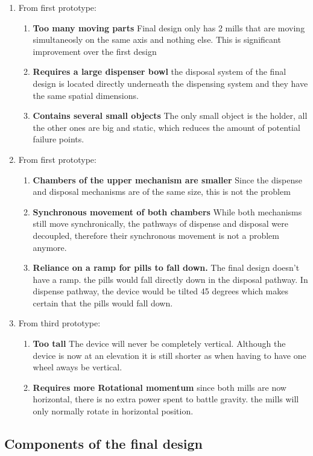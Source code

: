 \begin{enumerate}
	\item{From first prototype:}
	\begin{enumerate}
		\item{\textbf{Too many moving parts}} Final design only has 2 mills that are moving simultaneosly on the same axis and nothing else. This is significant improvement over the first design
		\item{\textbf{Requires a large dispenser bowl}} the disposal system of the final design is located directly underneath the dispensing system and they have the same spatial dimensions.
		\item{\textbf{Contains several small objects}} The only small object is the holder, all the other ones are big and static, which reduces the amount of potential failure points.
	\end{enumerate}
	\item{From first prototype:}
	\begin{enumerate}
		\item{\textbf{Chambers of the upper mechanism are smaller}} Since the dispense and disposal mechanisms are of the same size, this is not the problem
		\item{\textbf{Synchronous movement of both chambers}} While both mechanisms still move synchronically, the pathways of dispense and disposal were decoupled, therefore their synchronous movement is not a problem anymore.
		\item{\textbf{Reliance on a ramp for pills to fall down.}} The final design doesn't have a ramp. the pills would fall directly down in the disposal pathway. In dispense pathway, the device would be tilted 45 degrees which makes certain that the pills would fall down.
	\end{enumerate}
	\item{From third prototype:}
	\begin{enumerate}
		\item{\textbf{Too tall}} The device will never be completely vertical. Although the device is now at an elevation it is still shorter as when having to have one wheel aways be vertical.
		\item{\textbf{Requires more Rotational momentum}} since both mills are now horizontal, there is no extra power spent to battle gravity. the mills will only normally rotate in horizontal position.
	\end{enumerate}
\end{enumerate}
\newpage
\subsection{Components of the final design}
